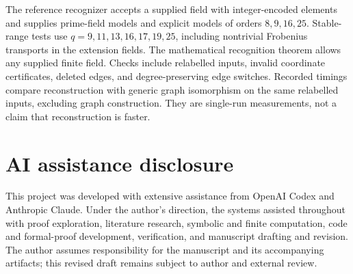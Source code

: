 \documentclass[11pt]{article}
\theoremstyle{definition}
\theoremstyle{remark}
\begin{document}
The reference recognizer accepts a supplied field with integer-encoded
elements and supplies prime-field models and explicit models of orders
$8,9,16,25$. Stable-range tests use $q=9,11,13,16,17,19,25$, including
nontrivial Frobenius transports in the extension fields. The
mathematical recognition theorem allows any supplied finite field.
Checks include relabelled inputs, invalid coordinate certificates,
deleted edges, and degree-preserving edge switches. Recorded timings
compare reconstruction with generic graph isomorphism on the same
relabelled inputs, excluding graph construction. They are single-run
measurements, not a claim that reconstruction is faster.

\section*{AI assistance disclosure}

This project was developed with extensive assistance from OpenAI Codex and
Anthropic Claude. Under the author's direction, the systems assisted
throughout with proof exploration, literature research, symbolic and finite
computation, code and formal-proof development, verification, and manuscript
drafting and revision. The author assumes responsibility for the manuscript and its accompanying
artifacts; this revised draft remains subject to author and external review.
\end{document}
